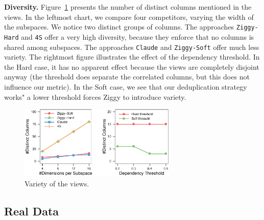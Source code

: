 \textbf{Diversity.} Figure~\ref{pic:synthvariety} presents the number of
distinct co\-lumns mentioned in the views. In the leftmost chart, we compare
four competitors, varying the width of the subspaces. We notice two distinct
groups of columns. The approaches \texttt{Ziggy-Hard} and \texttt{4S} offer a
very high diversity, because they enforce that no columns is shared among
subspaces. The approaches \texttt{Claude} and \texttt{Ziggy-Soft} offer much
less variety. The rightmost figure illustrates the effect of the dependency
threshold. In the Hard case, it has no apparent effect because the views are
completely disjoint anyway (the threshold  does separate the correlated
columns, but this does not influence our metric). In the Soft case, we see that
our deduplication strategy works" a lower threshold forces Ziggy to introduce
variety.

\begin{figure}[t!]
  \centering
  \includegraphics[height=3.5cm]{Plots/Synth-Dedup}
  \caption{Variety of the views.}
  \label{pic:synthvariety}
\end{figure}

\subsection{Real Data}
\label{sec:realdata}

